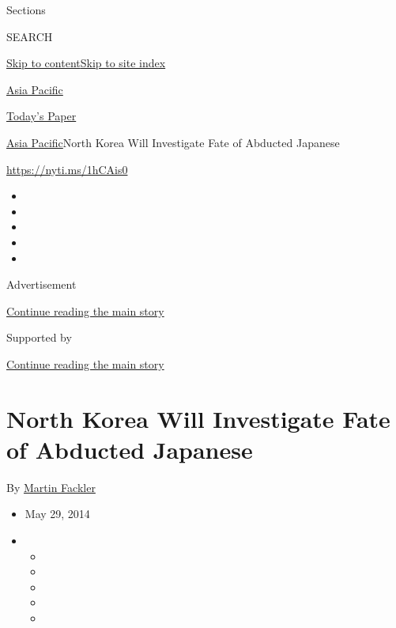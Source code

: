 Sections

SEARCH

\protect\hyperlink{site-content}{Skip to
content}\protect\hyperlink{site-index}{Skip to site index}

\href{https://www.nytimes.com/section/world/asia}{Asia Pacific}

\href{https://myaccount.nytimes.com/auth/login?response_type=cookie\&client_id=vi}{}

\href{https://www.nytimes.com/section/todayspaper}{Today's Paper}

\href{/section/world/asia}{Asia Pacific}\textbar{}North Korea Will
Investigate Fate of Abducted Japanese

\url{https://nyti.ms/1hCAis0}

\begin{itemize}
\item
\item
\item
\item
\item
\end{itemize}

Advertisement

\protect\hyperlink{after-top}{Continue reading the main story}

Supported by

\protect\hyperlink{after-sponsor}{Continue reading the main story}

\hypertarget{north-korea-will-investigate-fate-of-abducted-japanese}{%
\section{North Korea Will Investigate Fate of Abducted
Japanese}\label{north-korea-will-investigate-fate-of-abducted-japanese}}

By \href{http://www.nytimes.com/by/martin-fackler}{Martin Fackler}

\begin{itemize}
\item
  May 29, 2014
\item
  \begin{itemize}
  \item
  \item
  \item
  \item
  \item
  \end{itemize}
\end{itemize}

